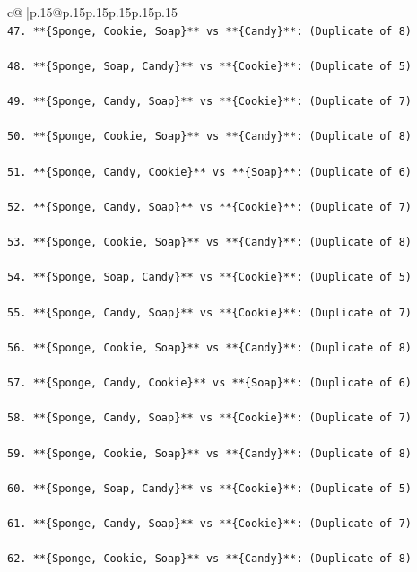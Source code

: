\documentclass{article}
\begin{document}
{\begin{supertabular}{c@{$\;$}|p{.15\linewidth}@{}p{.15\linewidth}p{.15\linewidth}p{.15\linewidth}p{.15\linewidth}p{.15\linewidth}}
{{{\\ 
\texttt{47. **\{Sponge, Cookie, Soap\}** vs **\{Candy\}**: (Duplicate of 8)} \\
\\ 
\texttt{48. **\{Sponge, Soap, Candy\}** vs **\{Cookie\}**: (Duplicate of 5)} \\
\\ 
\texttt{49. **\{Sponge, Candy, Soap\}** vs **\{Cookie\}**: (Duplicate of 7)} \\
\\ 
\texttt{50. **\{Sponge, Cookie, Soap\}** vs **\{Candy\}**: (Duplicate of 8)} \\
\\ 
\texttt{51. **\{Sponge, Candy, Cookie\}** vs **\{Soap\}**: (Duplicate of 6)} \\
\\ 
\texttt{52. **\{Sponge, Candy, Soap\}** vs **\{Cookie\}**: (Duplicate of 7)} \\
\\ 
\texttt{53. **\{Sponge, Cookie, Soap\}** vs **\{Candy\}**: (Duplicate of 8)} \\
\\ 
\texttt{54. **\{Sponge, Soap, Candy\}** vs **\{Cookie\}**: (Duplicate of 5)} \\
\\ 
\texttt{55. **\{Sponge, Candy, Soap\}** vs **\{Cookie\}**: (Duplicate of 7)} \\
\\ 
\texttt{56. **\{Sponge, Cookie, Soap\}** vs **\{Candy\}**: (Duplicate of 8)} \\
\\ 
\texttt{57. **\{Sponge, Candy, Cookie\}** vs **\{Soap\}**: (Duplicate of 6)} \\
\\ 
\texttt{58. **\{Sponge, Candy, Soap\}** vs **\{Cookie\}**: (Duplicate of 7)} \\
\\ 
\texttt{59. **\{Sponge, Cookie, Soap\}** vs **\{Candy\}**: (Duplicate of 8)} \\
\\ 
\texttt{60. **\{Sponge, Soap, Candy\}** vs **\{Cookie\}**: (Duplicate of 5)} \\
\\ 
\texttt{61. **\{Sponge, Candy, Soap\}** vs **\{Cookie\}**: (Duplicate of 7)} \\
\\ 
\texttt{62. **\{Sponge, Cookie, Soap\}** vs **\{Candy\}**: (Duplicate of 8)} \\
}}}
\end{supertabular}}
\end{document}
